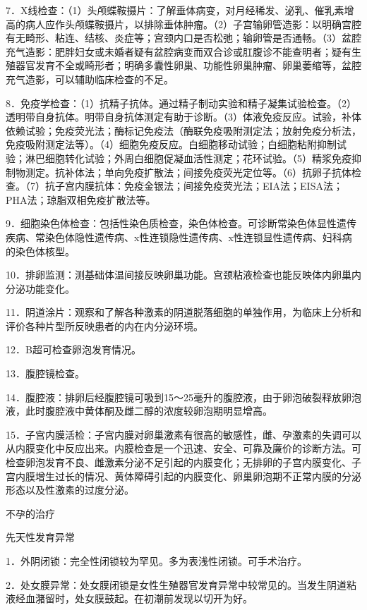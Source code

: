 \documentclass[12pt,UTF8]{ctexbook}
\begin{document}
7．X线检查：（1）头颅蝶鞍摄片：了解垂体病变，对月经稀发、泌乳、催乳素增高的病人应作头颅蝶鞍摄片，以排除垂体肿瘤。（2）子宫输卵管造影：以明确宫腔有无畸形、粘连、结核、炎症等；宫颈内口是否松弛；输卵管是否通畅。（3）盆腔充气造影：肥胖妇女或未婚者疑有盆腔病变而双合诊或肛腹诊不能查明者；疑有生殖器官发育不全或畸形者；明确多囊性卵巢、功能性卵巢肿瘤、卵巢萎缩等，盆腔充气造影，可以辅助临床检查的不足。

8．免疫学检查：（1）抗精子抗体。通过精子制动实验和精子凝集试验检查。（2）透明带自身抗体。明带自身抗体测定有助于诊断。（3）体液免疫反应。试验，补体依赖试验；免疫荧光法；酶标记免疫法（酶联免疫吸附测定法；放射免疫分析法，免疫吸附测定法等）。（4）细胞免疫反应。白细胞移动试验；白细胞粘附抑制试验；淋巴细胞转化试验；外周白细胞促凝血活性测定；花环试验。（5）精浆免疫抑制物测定。抗补体法；单向免疫扩散法；间接免疫荧光定位等。（6）抗卵子抗体检查。（7）抗子宫内膜抗体：免疫金银法；间接免疫荧光法；EIA法；EISA法；PHA法；琼脂双相免疫扩散法等。

9．细胞染色体检查：包括性染色质检查，染色体检查。可诊断常染色体显性遗传疾病、常染色体隐性遗传病、x性连锁隐性遗传病、x性连锁显性遗传病、妇科病的染色体核型。

10．排卵监测：测基础体温间接反映卵巢功能。宫颈粘液检查也能反映体内卵巢内分泌功能变化。

11．阴道涂片：观察和了解各种激素的阴道脱落细胞的单独作用，为临床上分析和评价各种片型所反映患者的内在内分泌环境。

12．B超可检查卵泡发育情况。

13．腹腔镜检查。

14．腹腔液：排卵后经腹腔镜可吸到15～25毫升的腹腔液，由于卵泡破裂释放卵泡液，此时腹腔液中黄体酮及雌二醇的浓度较卵泡期明显增高。

15．子宫内膜活检：子宫内膜对卵巢激素有很高的敏感性，雌、孕激素的失调可以从内膜变化中反应出来。内膜检查是一个迅速、安全、可靠及廉价的诊断方法。可检查卵泡发育不良、雌激素分泌不足引起的内膜变化；无排卵的子宫内膜变化、子宫内膜增生过长的情况、黄体障碍引起的内膜变化、卵巢卵泡期不正常内膜的分泌形态以及性激素的过度分泌。





不孕的治疗


先天性发育异常

1．外阴闭锁：完全性闭锁较为罕见。多为表浅性闭锁。可手术治疗。

2．处女膜异常：处女膜闭锁是女性生殖器官发育异常中较常见的。当发生阴道粘液经血潴留时，处女膜鼓起。在初潮前发现以切开为好。
\end{document}
